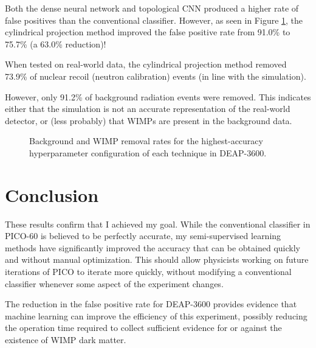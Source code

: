 \documentclass[12pt]{article}
\begin{document}
Both the dense neural network and topological CNN produced a higher rate of false positives than the conventional classifier. However, as seen in Figure \ref{deap_final_results}, the cylindrical projection method improved the false positive rate from 91.0\% to 75.7\% (a 63.0\% reduction)!

When tested on real-world data, the cylindrical projection method removed 73.9\% of nuclear recoil (neutron calibration) events (in line with the simulation).

However, only 91.2\% of background radiation events were removed. This indicates either that the simulation is not an accurate representation of the real-world detector, or (less probably) that WIMPs are present in the background data.

\begin{figure}[ht]
    \centering
    \caption{\label{deap_final_results} Background and WIMP removal rates for the highest-accuracy hyperparameter configuration of each technique in DEAP-3600.}
\end{figure}

\section{Conclusion}

These results confirm that I achieved my goal. While the conventional classifier in PICO-60 is believed to be perfectly accurate, my semi-supervised learning methods have significantly improved the accuracy that can be obtained quickly and without manual optimization. This should allow physicists working on future iterations of PICO to iterate more quickly, without modifying a conventional classifier whenever some aspect of the experiment changes.

The reduction in the false positive rate for DEAP-3600 provides evidence that machine learning can improve the efficiency of this experiment, possibly reducing the operation time required to collect sufficient evidence for or against the existence of WIMP dark matter.
\end{document}
